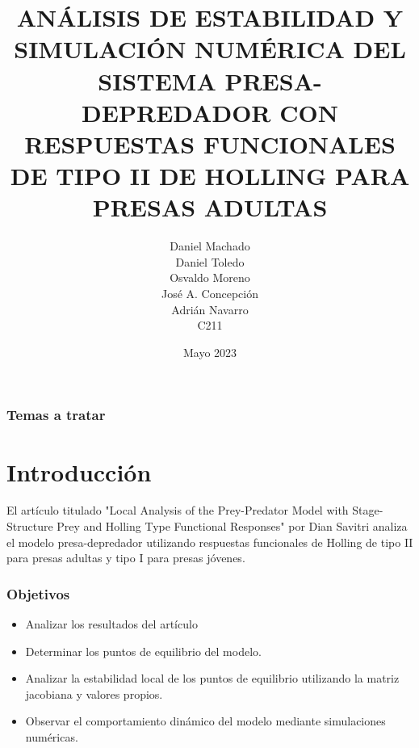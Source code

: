 \documentclass{beamer}
\title[T\'itulo del trabajo]{ANÁLISIS DE ESTABILIDAD Y SIMULACIÓN NUMÉRICA DEL SISTEMA PRESA-DEPREDADOR CON RESPUESTAS FUNCIONALES DE TIPO II DE HOLLING PARA PRESAS ADULTAS}
\author[Machado, Toledo, Moreno, Concepci\'on, Navarro]
		{
			Daniel Machado \\
			Daniel Toledo \\
			Osvaldo Moreno \\
			Jos\'e A. Concepci\'on \\
			Adri\'an Navarro \\
			{\small C211}
		}
\date{Mayo 2023}
\begin{document}

\begin{frame}
	\frametitle{Temas a tratar}
	\tableofcontents
\end{frame}

\section{Introducci\'on}
\begin{frame}
	\begin{minipage}{10cm}
		El artículo titulado "Local Analysis of the Prey-Predator Model with Stage-Structure Prey and Holling
		Type Functional Responses" por Dian Savitri analiza el modelo presa-depredador utilizando respuestas funcionales de Holling de tipo II para presas adultas y tipo I para presas j\'ovenes.
	\end{minipage}
\end{frame}

\begin{frame}
	\frametitle{Objetivos}
	\begin{minipage}{10cm}
		\begin{itemize}
			\item Analizar los resultados del art\'iculo
			\item Determinar los puntos de equilibrio del modelo.
			\item Analizar la estabilidad local de los puntos de equilibrio utilizando la matriz jacobiana y valores propios.
			\item Observar el comportamiento dinámico del modelo mediante
			      simulaciones numéricas.
		\end{itemize}
	\end{minipage}
\end{frame}
\end{document}
